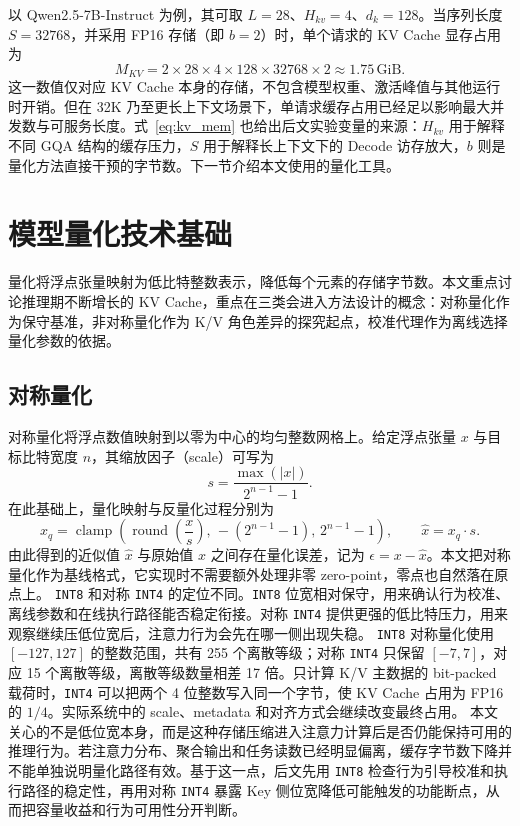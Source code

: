 以 Qwen2.5-7B-Instruct 为例，其可取 $L=28$、$H_{kv}=4$、$d_k=128$。当序列长度 $S=32768$，并采用 FP16 存储（即 $b=2$）时，单个请求的 KV Cache 显存占用为
\begin{equation}
M_{KV}
= 2 \times 28 \times 4 \times 128 \times 32768 \times 2
\approx 1.75\,\mathrm{GiB}.
  \label{eq:kv_mem_example}
\end{equation}
这一数值仅对应 KV Cache 本身的存储，不包含模型权重、激活峰值与其他运行时开销。但在 32K 乃至更长上下文场景下，单请求缓存占用已经足以影响最大并发数与可服务长度。式~\eqref{eq:kv_mem} 也给出后文实验变量的来源：$H_{kv}$ 用于解释不同 GQA 结构的缓存压力，$S$ 用于解释长上下文下的 Decode 访存放大，$b$ 则是量化方法直接干预的字节数。下一节介绍本文使用的量化工具。

\section{模型量化技术基础}

量化将浮点张量映射为低比特整数表示，降低每个元素的存储字节数。本文重点讨论推理期不断增长的 KV Cache，重点在三类会进入方法设计的概念：对称量化作为保守基准，非对称量化作为 K/V 角色差异的探究起点，校准代理作为离线选择量化参数的依据。

\subsection{对称量化}

对称量化将浮点数值映射到以零为中心的均匀整数网格上。给定浮点张量 $x$ 与目标比特宽度 $n$，其缩放因子（scale）可写为
\begin{equation}
s = \frac{\max(|x|)}{2^{n-1}-1}.
  \label{eq:sym_scale}
\end{equation}
在此基础上，量化映射与反量化过程分别为
\begin{equation}
x_q = \operatorname{clamp}\!\left(\operatorname{round}\!\left(\frac{x}{s}\right),\,-(2^{n-1}-1),\,2^{n-1}-1\right), \qquad
\hat{x} = x_q \cdot s.
  \label{eq:sym_quant}
\end{equation}
由此得到的近似值 $\hat{x}$ 与原始值 $x$ 之间存在量化误差，记为 $\epsilon = x - \hat{x}$。本文把对称量化作为基线格式，它实现时不需要额外处理非零 zero-point，零点也自然落在原点上。
\texttt{INT8} 和对称 \texttt{INT4} 的定位不同。\texttt{INT8} 位宽相对保守，用来确认行为校准、离线参数和在线执行路径能否稳定衔接。对称 \texttt{INT4} 提供更强的低比特压力，用来观察继续压低位宽后，注意力行为会先在哪一侧出现失稳。
\texttt{INT8} 对称量化使用 $[-127,127]$ 的整数范围，共有 255 个离散等级；对称 \texttt{INT4} 只保留 $[-7,7]$，对应 15 个离散等级，离散等级数量相差 17 倍。只计算 K/V 主数据的 bit-packed 载荷时，\texttt{INT4} 可以把两个 4 位整数写入同一个字节，使 KV Cache 占用为 FP16 的 $1/4$。实际系统中的 scale、metadata 和对齐方式会继续改变最终占用。
本文关心的不是低位宽本身，而是这种存储压缩进入注意力计算后是否仍能保持可用的推理行为。若注意力分布、聚合输出和任务读数已经明显偏离，缓存字节数下降并不能单独说明量化路径有效。基于这一点，后文先用 \texttt{INT8} 检查行为引导校准和执行路径的稳定性，再用对称 \texttt{INT4} 暴露 Key 侧位宽降低可能触发的功能断点，从而把容量收益和行为可用性分开判断。



